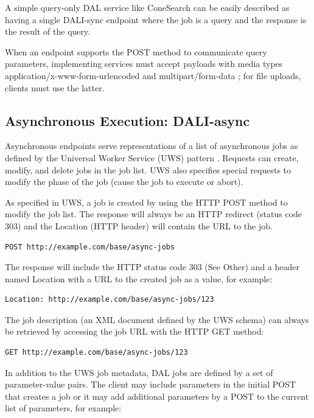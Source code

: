 \documentclass[11pt,letter]{ivoa}
\begin{document}
A simple query-only DAL service like ConeSearch can be easily described as
having a single DALI-sync endpoint where the job is a query and the response is
the result of the query.

When an endpoint supports the POST method to communicate query
parameters, implementing services must accept payloads with media types
application/x-www-form-urlencoded \citep{std:RFC1866} and
multipart/form-data \citep{std:RFC7578}; for file uploads, clients must
use the latter.

\subsection{Asynchronous Execution: DALI-async}
\label{sec:dali-async}
Asynchronous endpoints serve representations of a list of asynchronous jobs
as defined by the Universal Worker Service (UWS) pattern \citep{2016ivoa.spec.1024H}.
Requests can
create, modify, and delete jobs in the job list. UWS also specifies special
requests to modify the phase of the job (cause the job to execute or abort).

As specified in UWS, a job is created by using the HTTP POST method to modify
the job list. The response will always be an HTTP redirect (status code 303) and
the Location (HTTP header) will contain the URL to the job.

\begin{verbatim}
POST http://example.com/base/async-jobs
\end{verbatim}

The response will include the HTTP status code 303 (See Other) and a header
named Location with a URL to the created job as a value, for example:

\begin{verbatim}
Location: http://example.com/base/async-jobs/123
\end{verbatim}

The job description (an XML document defined by the UWS schema) can always be
retrieved by accessing the job URL with the HTTP GET method:

\begin{verbatim}
GET http://example.com/base/async-jobs/123
\end{verbatim}



In addition to the UWS job metadata, DAL jobs are defined by a set of
parameter-value pairs. The client may include parameters in the initial POST
that creates a job or it may add additional parameters by a POST to the current
list of parameters, for example:
\end{document}

